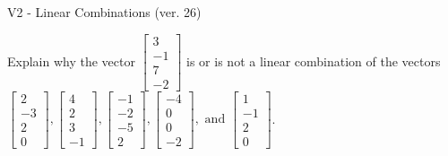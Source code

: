 \begin{exercise}
  \begin{exerciseTitle}V2 - Linear Combinations (ver. 26)\end{exerciseTitle}
  \begin{exerciseStatement}
    Explain why the vector \(\left[\begin{array}{c}
3 \\
-1 \\
7 \\
-2
\end{array}\right]\)  is or is not a linear 
	combination of the vectors \(\left[\begin{array}{c}
2 \\
-3 \\
2 \\
0
\end{array}\right] , \left[\begin{array}{c}
4 \\
2 \\
3 \\
-1
\end{array}\right] , \left[\begin{array}{c}
-1 \\
-2 \\
-5 \\
2
\end{array}\right] , \left[\begin{array}{c}
-4 \\
0 \\
0 \\
-2
\end{array}\right] , \text{ and } \left[\begin{array}{c}
1 \\
-1 \\
2 \\
0
\end{array}\right]\).
	



\end{exerciseStatement}
\end{exercise}

